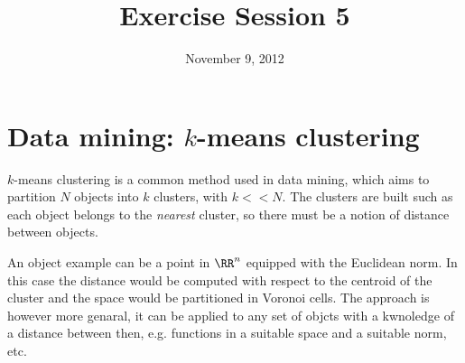 \documentclass[10pt,a4paper]{article}
\title{Exercise Session 5}
\date{November 9, 2012}
\begin{document}
\lstset{language=[ISO]C++}
\maketitle

\section*{Data mining: $k$-means clustering}

$k$-means clustering is a common method used in data mining, which aims to
partition $N$ objects into $k$ clusters, with $k << N$. The clusters are built
such as each object belongs to the \emph{nearest} cluster, so there must be a
notion of distance between objects.

An object example can be a point in $\RR^n$ equipped with the Euclidean norm. In
this case the distance would be computed with respect to the centroid of the
cluster and the space would be partitioned in Voronoi cells. The approach is
however more genaral, it can be applied to any set of objcts with a kwnoledge of
a distance between then, e.g. functions in a suitable space and a suitable norm,
etc.
\end{document}
